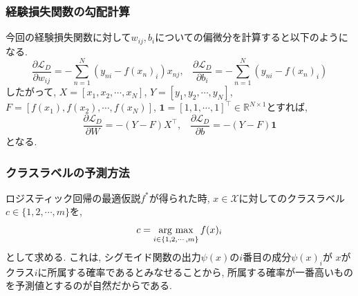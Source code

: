 \documentclass[dvipdfmx,11pt]{beamer}		%
\newcommand{\R}{\mathbb{R}}
\newcommand{\X}{\mathcal{X}}
\newcommand{\Loss}{\mathcal{L}_{D}}
\newcommand{\argmax}{\mathop{\rm arg~max}\limits}
\begin{document}
    \begin{frame}
        \frametitle{経験損失関数の勾配計算}
        今回の経験損失関数に対して$w_{ij}, b_{i}$についての偏微分を計算すると以下のようになる. 
        \begin{equation*}
            \frac{\partial\Loss}{\partial w_{ij}} = -\sum_{n = 1}^{N}\left(y_{ni} - f(x_{n})_{i}\right)x_{nj}, \hspace{10pt}\frac{\partial\Loss}{\partial b_{i}} = -\sum_{n = 1}^{N}(y_{ni} - f(x_{n})_{i})
        \end{equation*}
        したがって, $X = [x_{1}, x_{2}, \cdots, x_{N}]$, $Y = [y_1, y_2, \cdots, y_N]$, $F = [f(x_1), f(x_2), \cdots, f(x_N)]$, 
        $\mathbf{1} = [1, 1, \cdots, 1]^{\top}\in\R^{N\times 1}$とすれば,
        \begin{equation*}
            \frac{\partial\Loss}{\partial W} = -(Y - F)X^{\top}, \hspace{10pt}  \frac{\partial\Loss}{\partial b} = -(Y - F)\mathbf{1}
        \end{equation*}
        となる. 
    \end{frame}
    \begin{frame}
        \frametitle{クラスラベルの予測方法}
        ロジスティック回帰の最適仮説$f^{*}$が得られた時, $x\in\X$に対してのクラスラベル
        $c\in\{1, 2, \cdots, m\}$を,
        \begin{equation*}
            c = \argmax_{i\in\{1, 2, \cdots, m\}}f(x)_{i}
        \end{equation*}
        として求める. これは, シグモイド関数の出力$\psi(x)$の$i$番目の成分$\psi(x)_i$が
        $x$がクラス$i$に所属する確率であるとみなせることから, 所属する確率が一番高いもの
        を予測値とするのが自然だからである. 
    \end{frame}
\end{document}
